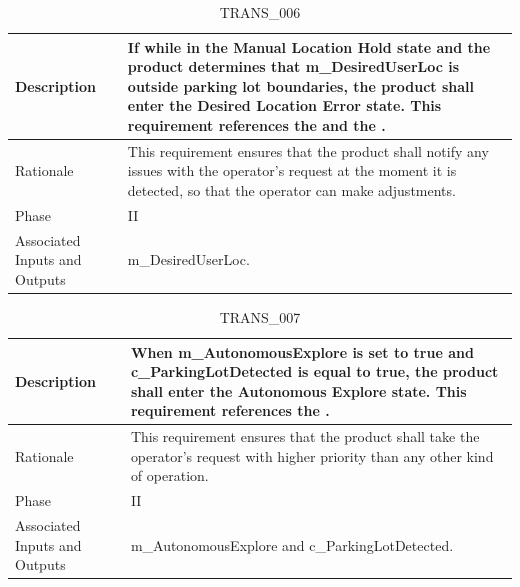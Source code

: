 \documentclass{article}
\begin{document}
\begin{table}[!h]
\begin{center}
\caption {TRANS\_006} 
\label{TRANS_006}
\begin{tabular}{ | m{3cm} | m{11cm} | }
\hline
Description & If while in the Manual Location Hold state and the product determines that m\_DesiredUserLoc is outside parking lot boundaries, the product shall enter the Desired Location Error state. This requirement references the \nameref{Manual Location Move State} and the \nameref{Desired Location Error State}. \\
\hline
Rationale & This requirement ensures that the product shall notify any issues with the operator's request at the moment it is detected, so that the operator can make adjustments. \\
\hline
Phase & II \\
\hline
Associated Inputs and Outputs & m\_DesiredUserLoc. \\
\hline
\end{tabular}
\end{center}
\end{table}

\begin{table}[!h]
\begin{center}
\caption {TRANS\_007} 
\label{TRANS_007}
\begin{tabular}{ | m{3cm} | m{11cm} | }
\hline
Description & When m\_AutonomousExplore is set to true and c\_ParkingLotDetected is equal to true, the product shall enter the Autonomous Explore state. This requirement references the \nameref{Autonomous Explore State}. \\
\hline
Rationale & This requirement ensures that the product shall take the operator's request with higher priority than any other kind of operation. \\
\hline
Phase & II \\
\hline
Associated Inputs and Outputs & m\_AutonomousExplore and c\_ParkingLotDetected. \\
\hline
\end{tabular}
\end{center}
\end{table}
\end{document}
